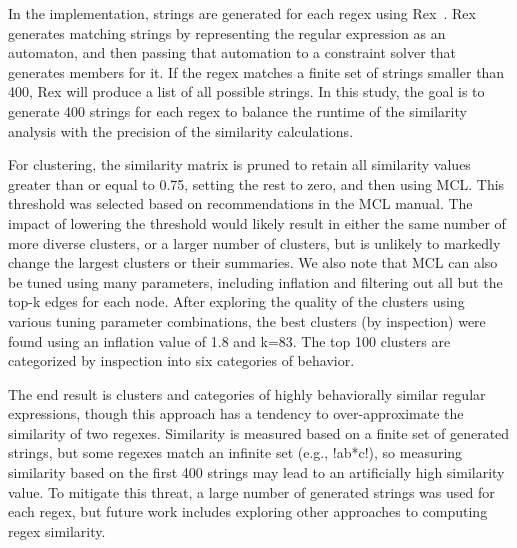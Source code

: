 In the implementation, strings are generated for each regex using Rex~\cite{rex}.  Rex generates matching strings by representing the regular expression as an automaton, and then passing that automation to a constraint solver that generates members for it.  If the regex matches a finite set of strings smaller than 400, Rex will produce a list of all possible strings.
In this study, the goal is to generate 400 strings for each regex to balance the runtime of the similarity analysis with the precision of the similarity calculations.

For clustering, the similarity matrix is pruned to retain all similarity values greater than or equal to 0.75, setting the rest to zero, and then using MCL.
This threshold was selected based on recommendations in the MCL manual. The impact of lowering the threshold would likely result  in either the same number of more diverse clusters, or a larger number of clusters, but is unlikely to markedly change the largest clusters or their summaries.
We also note that MCL can also be tuned using many parameters, including inflation and filtering out all but the top-k edges for each node.
After exploring the quality of the clusters using various tuning parameter combinations, the best clusters (by inspection) were found using an inflation value of 1.8 and k=83.   The top 100 clusters are categorized by inspection into six categories of behavior.

The end result is clusters and categories of highly behaviorally similar regular expressions, though this approach has a tendency to over-approximate the similarity of two regexes. Similarity is measured based on a finite set of generated strings, but some regexes match an infinite set (e.g., \cverb!ab*c!), so measuring similarity based on the first 400 strings may lead to an artificially high similarity value. To mitigate this threat, a large number of generated strings was used for each regex, but future work includes exploring other approaches to computing regex similarity.
